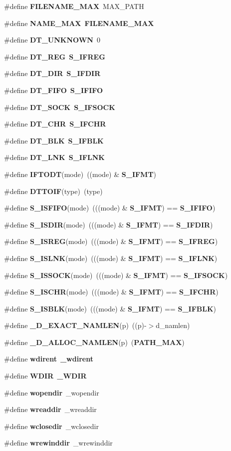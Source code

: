 \begin{DoxyCompactItemize}
\item 
\#define {\bf F\+I\+L\+E\+N\+A\+M\+E\+\_\+\+M\+AX}~M\+A\+X\+\_\+\+P\+A\+TH
\item 
\#define {\bf N\+A\+M\+E\+\_\+\+M\+AX}~{\bf F\+I\+L\+E\+N\+A\+M\+E\+\_\+\+M\+AX}
\item 
\#define {\bf D\+T\+\_\+\+U\+N\+K\+N\+O\+WN}~0
\item 
\#define {\bf D\+T\+\_\+\+R\+EG}~{\bf S\+\_\+\+I\+F\+R\+EG}
\item 
\#define {\bf D\+T\+\_\+\+D\+IR}~{\bf S\+\_\+\+I\+F\+D\+IR}
\item 
\#define {\bf D\+T\+\_\+\+F\+I\+FO}~{\bf S\+\_\+\+I\+F\+I\+FO}
\item 
\#define {\bf D\+T\+\_\+\+S\+O\+CK}~{\bf S\+\_\+\+I\+F\+S\+O\+CK}
\item 
\#define {\bf D\+T\+\_\+\+C\+HR}~{\bf S\+\_\+\+I\+F\+C\+HR}
\item 
\#define {\bf D\+T\+\_\+\+B\+LK}~{\bf S\+\_\+\+I\+F\+B\+LK}
\item 
\#define {\bf D\+T\+\_\+\+L\+NK}~{\bf S\+\_\+\+I\+F\+L\+NK}
\item 
\#define {\bf I\+F\+T\+O\+DT}(mode)~((mode) \& {\bf S\+\_\+\+I\+F\+MT})
\item 
\#define {\bf D\+T\+T\+O\+IF}(type)~(type)
\item 
\#define {\bf S\+\_\+\+I\+S\+F\+I\+FO}(mode)~(((mode) \& {\bf S\+\_\+\+I\+F\+MT}) == {\bf S\+\_\+\+I\+F\+I\+FO})
\item 
\#define {\bf S\+\_\+\+I\+S\+D\+IR}(mode)~(((mode) \& {\bf S\+\_\+\+I\+F\+MT}) == {\bf S\+\_\+\+I\+F\+D\+IR})
\item 
\#define {\bf S\+\_\+\+I\+S\+R\+EG}(mode)~(((mode) \& {\bf S\+\_\+\+I\+F\+MT}) == {\bf S\+\_\+\+I\+F\+R\+EG})
\item 
\#define {\bf S\+\_\+\+I\+S\+L\+NK}(mode)~(((mode) \& {\bf S\+\_\+\+I\+F\+MT}) == {\bf S\+\_\+\+I\+F\+L\+NK})
\item 
\#define {\bf S\+\_\+\+I\+S\+S\+O\+CK}(mode)~(((mode) \& {\bf S\+\_\+\+I\+F\+MT}) == {\bf S\+\_\+\+I\+F\+S\+O\+CK})
\item 
\#define {\bf S\+\_\+\+I\+S\+C\+HR}(mode)~(((mode) \& {\bf S\+\_\+\+I\+F\+MT}) == {\bf S\+\_\+\+I\+F\+C\+HR})
\item 
\#define {\bf S\+\_\+\+I\+S\+B\+LK}(mode)~(((mode) \& {\bf S\+\_\+\+I\+F\+MT}) == {\bf S\+\_\+\+I\+F\+B\+LK})
\item 
\#define {\bf \+\_\+\+D\+\_\+\+E\+X\+A\+C\+T\+\_\+\+N\+A\+M\+L\+EN}(p)~((p)-\/$>$d\+\_\+namlen)
\item 
\#define {\bf \+\_\+\+D\+\_\+\+A\+L\+L\+O\+C\+\_\+\+N\+A\+M\+L\+EN}(p)~({\bf P\+A\+T\+H\+\_\+\+M\+AX})
\item 
\#define {\bf wdirent}~{\bf \+\_\+wdirent}
\item 
\#define {\bf W\+D\+IR}~{\bf \+\_\+\+W\+D\+IR}
\item 
\#define {\bf wopendir}~\+\_\+wopendir
\item 
\#define {\bf wreaddir}~\+\_\+wreaddir
\item 
\#define {\bf wclosedir}~\+\_\+wclosedir
\item 
\#define {\bf wrewinddir}~\+\_\+wrewinddir
\end{DoxyCompactItemize}

